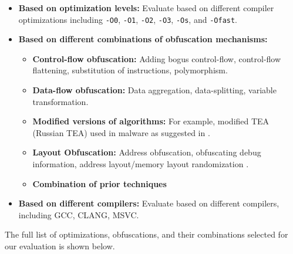 \begin{itemize}
\item \textbf{Based on optimization levels:} Evaluate based on different compiler optimizations including \texttt{-O0}, \texttt{-O1}, \texttt{-O2}, \texttt{-O3}, \texttt{-Os}, and \texttt{-Ofast}.

\item \textbf{Based on different combinations of obfuscation mechanisms:}

\begin{itemize}
\item \textbf{Control-flow obfuscation:} Adding bogus control-flow, control-flow flattening, substitution of instructions, polymorphism.

\item \textbf{Data-flow obfuscation:} Data aggregation, data-splitting, variable transformation.

\item \textbf{Modified versions of algorithms:} For example, modified TEA (Russian TEA) used in malware as suggested in \cite{xu2017cryptographic}.

\item \textbf{Layout Obfuscation:} Address obfuscation, obfuscating debug information, address layout/memory layout randomization .

\item \textbf{Combination of prior techniques}
\end{itemize}

\item \textbf{Based on different compilers:} Evaluate based on different compilers, including GCC, CLANG, MSVC.

\end{itemize}

The full list of optimizations, obfuscations, and their combinations selected for our evaluation is shown below.

